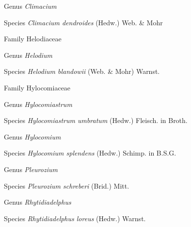 \documentclass[9pt, article]{memoir}
\begin{document}
\begin{multicols}{2}
\vspace{6pt}\noindent\hspace{30pt}Genus \textit{Climacium}


\vspace{6pt}\noindent\hspace{36pt}Species \textit{Climacium dendroides} (Hedw.) Web. \& Mohr


\vspace{6pt}\noindent\hspace{24pt}Family Helodiaceae


\vspace{6pt}\noindent\hspace{30pt}Genus \textit{Helodium}


\vspace{6pt}\noindent\hspace{36pt}Species \textit{Helodium blandowii} (Web. \& Mohr) Warnst.


\vspace{6pt}\noindent\hspace{24pt}Family Hylocomiaceae


\vspace{6pt}\noindent\hspace{30pt}Genus \textit{Hylocomiastrum}


\vspace{6pt}\noindent\hspace{36pt}Species \textit{Hylocomiastrum umbratum} (Hedw.) Fleisch. in Broth.


\vspace{6pt}\noindent\hspace{30pt}Genus \textit{Hylocomium}


\vspace{6pt}\noindent\hspace{36pt}Species \textit{Hylocomium splendens} (Hedw.) Schimp. in B.S.G.


\vspace{6pt}\noindent\hspace{30pt}Genus \textit{Pleurozium}


\vspace{6pt}\noindent\hspace{36pt}Species \textit{Pleurozium schreberi} (Brid.) Mitt.


\vspace{6pt}\noindent\hspace{30pt}Genus \textit{Rhytidiadelphus}


\vspace{6pt}\noindent\hspace{36pt}Species \textit{Rhytidiadelphus loreus} (Hedw.) Warnst.



\end{multicols}
\end{document}

